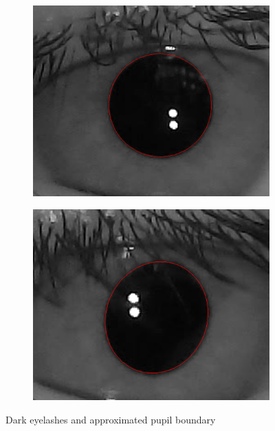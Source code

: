 \begin{figure}[h]
\begin{subfigure}{0.4\textwidth}
    \end{subfigure}
\label{fig:dark_eyelashes_vid}
    \centering
    \begin{subfigure}{0.4\textwidth}
        \centering
        \includegraphics[width=0.8\linewidth]{plots/acwe/resultmakeup.png} 
    \end{subfigure}
    \begin{subfigure}{0.4\textwidth}
        \centering
        \includegraphics[width=0.8\linewidth]{plots/acwe/resultmakeup2.png} 
    \end{subfigure}
\caption{Dark eyelashes and approximated pupil boundary}
\label{fig:dark_eyelashes_approx}
\end{figure}
